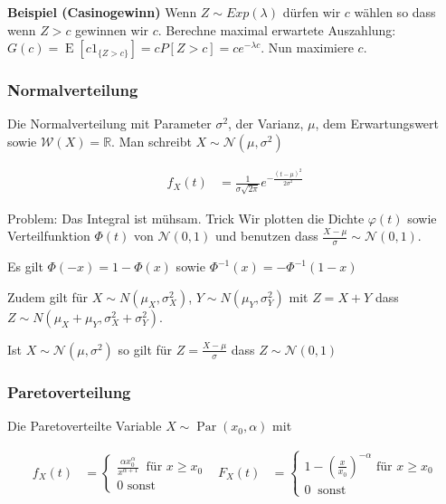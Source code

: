 \documentclass[25pt]{sciposter}
\newcommand{\R}{\mathbb{R}}
\newcommand{\W}{\mathcal{W}}
\newcommand{\Nor}{\mathcal{N}}
\newcommand{\E}{\operatorname{E}}
\begin{document}
\begin{multicols}{3}
\textbf{Beispiel (Casinogewinn)} Wenn $Z\sim Exp(\lambda)$ dürfen wir $c$ wählen so dass wenn $Z > c$ gewinnen wir $c$. Berechne maximal erwartete Auszahlung: $G(c) = \E[c1_{\{Z > c\}}] = cP[Z > c] = ce^{-\lambda c}$. Nun maximiere $c$.

\subsubsection*{Normalverteilung}
Die Normalverteilung mit Parameter $\sigma^2$, der Varianz, $\mu$, dem Erwartungswert sowie $\W(X) = \R$. Man schreibt $X\sim \Nor(\mu,\sigma^2)$

\begin{align*}
f_X(t) &= \frac{1}{\sigma\sqrt{2\pi}}e^{-\frac{(t-\mu)^2}{2\sigma^2}}
\end{align*}

Problem: Das Integral ist mühsam. Trick Wir plotten die Dichte $\varphi(t)$ sowie Verteilfunktion $\Phi(t)$ von $\Nor(0,1)$ und benutzen dass $\frac{X-\mu}{\sigma} \sim \Nor(0,1)$.
\begin{mdframed}
	Es gilt $\Phi(-x) = 1 - \Phi(x)$ sowie ${\Phi^{-1}(x) = -\Phi^{-1}(1-x)}$
\end{mdframed}


Zudem gilt für $X\sim N(\mu_X,\sigma^2_X)$, $Y \sim N(\mu_Y, \sigma^2_Y)$ mit $Z=X+Y$ dass $Z \sim N(\mu_X+\mu_Y, \sigma^2_X + \sigma^2_Y)$.

\begin{mdframed}
	Ist $X \sim \mathcal{N}(\mu,\sigma^2)$ so gilt für $Z={\frac  {X-\mu }{\sigma }}$ dass ${\displaystyle Z  \sim {\mathcal {N}}(0,1)}$
\end{mdframed}


\subsubsection*{Paretoverteilung}
Die Paretoverteilte Variable $X\sim\operatorname{Par}(x_0,\alpha)$ mit 

\begin{align*}
f_X(t) &= \begin{cases}
\frac{\alpha x_0 ^\alpha}{x^{\alpha+1}} \ \text{ für } x \geq x_0 \\
0 \text{ sonst}
\end{cases}
& 
F_X(t) &= \begin{cases}
1-\left(\frac{x}{x_0}\right)^{-\alpha} \text{ für } x \geq x_0\\
0 \ \text{ sonst}
\end{cases}
\end{align*}


\end{multicols}
\end{document}
